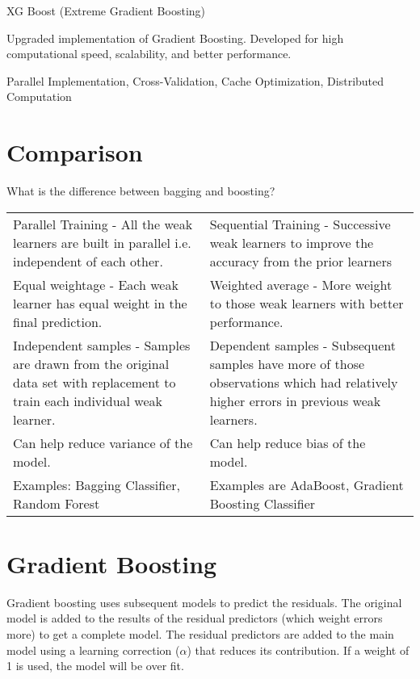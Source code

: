 \vspace{\baselineskip}
\noindent XG Boost (Extreme Gradient Boosting)
	\begin{bulletedlist}
		\item Upgraded implementation of Gradient Boosting. Developed for high computational speed, scalability, and better performance.
		\item Parallel Implementation, Cross-Validation, Cache Optimization, Distributed Computation
	\end{bulletedlist}

	\section{Comparison}
What is the difference between bagging and boosting?

	\noindent \begin{tabular}{|p{}|p{}|} \hline
		\tablecolumnheadervlinesone{Bagging} & \tablecolumnheadervlinestwo{Boosting} \\ \hline
		Parallel Training - All the weak learners are built in parallel i.e. independent of each other. &
		Sequential Training - Successive weak learners to improve the accuracy from the prior learners \\ \hline
		Equal weightage - Each weak learner has equal weight in the final prediction. &
		Weighted average - More weight to those weak learners with better performance. \\ \hline
		Independent samples - Samples are drawn from the original data set with replacement to train each individual weak learner. &
		Dependent samples - Subsequent samples have more of those observations which had relatively higher errors in previous weak learners. \\ \hline
		Can help reduce variance of the model. &
		Can help reduce bias of the model. \\ \hline
		Examples: Bagging Classifier, Random Forest &
		Examples are AdaBoost, Gradient Boosting Classifier \\ \hline
	\end{tabular}

	\section{Gradient Boosting}
Gradient boosting uses subsequent models to predict the residuals.  The original model is added to the results of the residual predictors (which weight errors more) to get a complete model.  The residual predictors are added to the main model using a learning correction ($\alpha$) that reduces its contribution.  If a weight of 1 is used, the model will be over fit.

